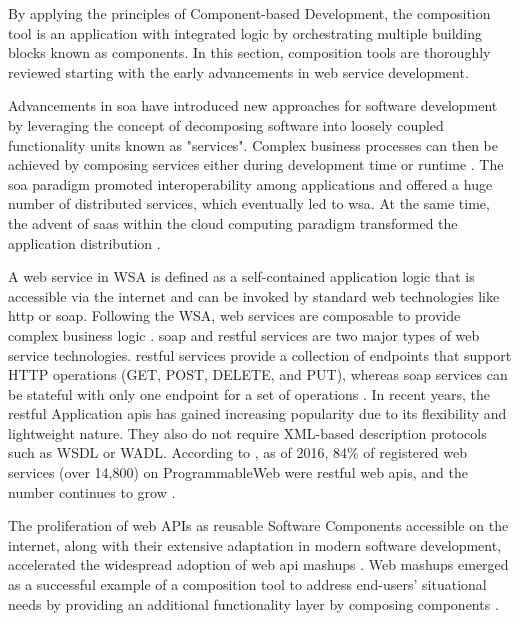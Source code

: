 By applying the principles of Component-based Development, the
composition tool is an application with integrated logic by
orchestrating multiple building blocks known as components. In this
section, composition tools are thoroughly reviewed starting with the
early advancements in web service development.

Advancements in \gls{soa} have introduced new
approaches for software development by leveraging the concept of
decomposing software into loosely coupled functionality units known as
"services". Complex business processes can then be achieved by composing
services either during development time or runtime \autocite{Tschudnowsky2016}. The \gls{soa} paradigm promoted interoperability among applications and
offered a huge number of distributed services, which eventually led to
\gls{wsa}. At the same time, the advent of \gls{saas} within the cloud computing paradigm transformed the
application distribution \autocite{Daniel2014}.

A web service in WSA is defined as a self-contained application logic that
is accessible via the internet and can be invoked by standard web
technologies like \gls{http} or \gls{soap}. Following the WSA, web services are
composable to provide complex business logic \autocite{Yang2002a}. \gls{soap} and \gls{rest}ful services are two major types of web service
technologies. \gls{rest}ful services provide a collection of endpoints that
support HTTP operations (GET, POST, DELETE, and PUT), whereas \gls{soap}
services can be stateful with only one endpoint for a set of operations \autocite{Daniel2014}. In recent years, the \gls{rest}ful Application
\gls{api}s has gained increasing popularity due to
its flexibility and lightweight nature. They also do not require
XML-based description protocols such as WSDL or WADL. According to
\autocite{Zhang2019}, as of 2016, 84\% of registered web services
(over 14,800) on ProgrammableWeb were \gls{rest}ful web \gls{api}s, and the number
continues to grow \autocite{Zhang2020}.

The proliferation of web APIs as reusable \gls{Software Component}s accessible
on the internet, along with their extensive adaptation in modern
software development, accelerated the widespread adoption of web \gls{api}
mashups \autocite{Xue2017}. Web mashups emerged as a successful
example of a composition tool to address end-users' situational needs by
providing an additional functionality layer by
composing components \autocite{Tschudnowsky2016}.

